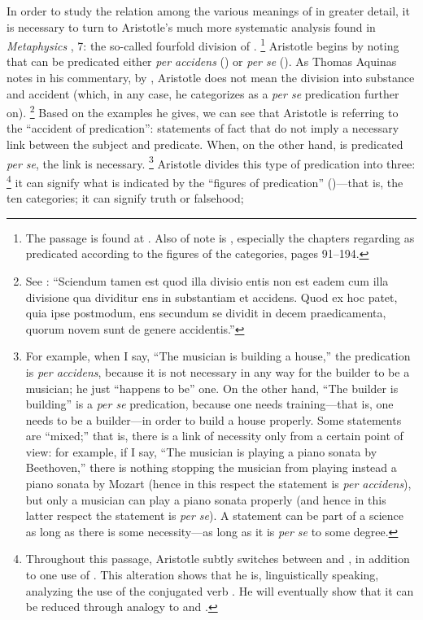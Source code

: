 In order to study the relation among the various meanings of  in greater detail, it is necessary to turn to Aristotle's much more systematic analysis found in \emph{Metaphysics} , 7: the so-called fourfold division of .%
%
\footnote{The passage is found at \cite[,~7, 1017a7-1017b9]{aristotle:metaphysics}. Also of note is \cite{brentano:several}, especially the chapters regarding  as predicated according to the figures of the categories, pages 91--194.}
%
Aristotle begins by noting that  can be predicated either \emph{per accidens} () or \emph{per se} (). As Thomas Aquinas notes in his commentary, by , Aristotle does not mean the division into substance and accident (which, in any case, he categorizes as a \emph{per se} predication further on).%
%
\footnote{See \cite[lib.~5, l.~9, n.~1 (Marietti n.~885)]{st:metaph}: ``Sciendum tamen est quod illa divisio entis non est eadem cum illa divisione qua dividitur ens in substantiam et accidens. Quod ex hoc patet, quia ipse postmodum, ens secundum se dividit in decem praedicamenta, quorum novem sunt de genere accidentis.''} Based on the examples he gives, we can see that Aristotle is referring to the ``accident of predication'': statements of fact that do not imply a necessary link between the subject and predicate. When, on the other hand,  is predicated \emph{per se}, the link is necessary.%
%
\footnote{For example, when I say, ``The musician is building a house,'' the predication is \emph{per accidens}, because it is not necessary in any way for the builder to be a musician; he just ``happens to be'' one. On the other hand, ``The builder is building'' is a \emph{per se} predication, because one needs training---that is, one needs to be a builder---in order to build a house properly. Some statements are ``mixed;'' that is, there is a link of necessity only from a certain point of view: for example, if I say, ``The musician is playing a piano sonata by Beethoven,'' there is nothing stopping the musician from playing instead a piano sonata by Mozart (hence in this respect the statement is \emph{per accidens}), but only a musician can play a piano sonata properly (and hence in this latter respect the statement is \emph{per se}). A statement can be part of a science as long as there is some necessity---as long as it is \emph{per se} to some degree.} Aristotle divides this type of predication into three:%
%
\footnote{Throughout this passage, Aristotle subtly switches between  and , in addition to one use of . This alteration shows that he is, linguistically speaking, analyzing the use of the conjugated verb . He will eventually show that it can be reduced through analogy to  and .} it can signify what is indicated by the ``figures of predication'' ()---that is, the ten categories; it can signify truth or falsehood;%
